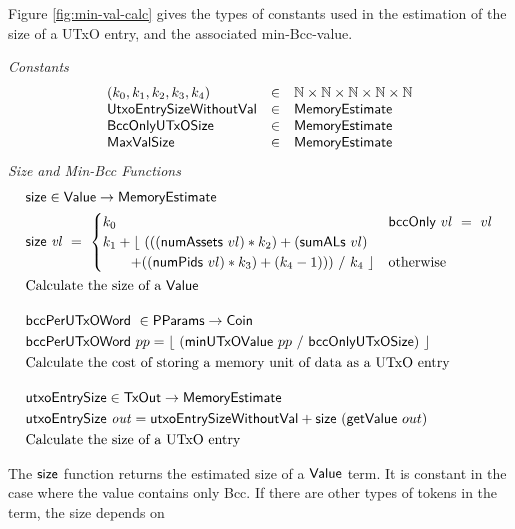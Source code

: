 Figure \ref{fig:min-val-calc} gives the types of constants used in the estimation
of the size of a UTxO entry, and the associated min-Bcc-value.

\begin{figure*}[h]
  \emph{Constants}
  \begin{equation*}
    \begin{array}{lcl}
      (k_0, k_1, k_2, k_3, k_4) & \in & \mathbb{N} \times \mathbb{N} \times \mathbb{N} \times \mathbb{N} \times \mathbb{N} \\
      \mathsf{UtxoEntrySizeWithoutVal} & \in & \mathsf{MemoryEstimate} \\
      \mathsf{BccOnlyUTxOSize} & \in & \mathsf{MemoryEstimate} \\
      \mathsf{MaxValSize} & \in & \mathsf{MemoryEstimate} \\
    \end{array}
  \end{equation*}
  \emph{Size and Min-Bcc Functions}
  \begin{align*}
    & \fun{size} \in \Value \to \MemoryEstimate \\
    & \fun{size}~\var{vl} ~=~
    \begin{cases}
      k_0 & \fun{bccOnly}~vl~=~vl \\
      k_1 + \lfloor~ (((\fun{numAssets}~vl) * k_2) + (\fun{sumALs}~vl) & \\
      ~~~~~~ + ((\fun{numPids}~vl) * k_3) + (k_4 - 1)))~ /~ k_4~\rfloor & \text{otherwise} \\
    \end{cases} \\
    & \text{Calculate the size of a $\Value$}
    \nextdef
    & \fun{bccPerUTxOWord}~\in \PParams \to \Coin \\
    & \fun{bccPerUTxOWord}~pp = \lfloor~ (\fun{minUTxOValue}~pp~/~ \mathsf{bccOnlyUTxOSize})~ \rfloor \\
    & \text{Calculate the cost of storing a memory unit of data as a UTxO entry}
    \nextdef
    & \fun{utxoEntrySize} \in \TxOut \to \MemoryEstimate \\
    & \fun{utxoEntrySize}~\var{out} = \mathsf{utxoEntrySizeWithoutVal} + \fun{size}~ (\fun{getValue}~out) \\
    & \text{Calculate the size of a UTxO entry}
\end{align*}
\caption{Value Size}
\label{fig:min-val-calc}
\end{figure*}

The $\mathsf{size}$ function returns the estimated size of a $\mathsf{Value}$ term. It is constant in the
case where the value contains only Bcc. If there are other types of tokens in the
term, the size depends on

